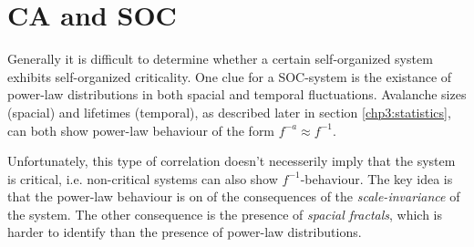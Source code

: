 \section{CA and SOC}
Generally it is difficult to determine whether a certain self-organized system exhibits self-organized criticality. One clue for a SOC-system is the existance of power-law distributions in both spacial and temporal fluctuations. Avalanche sizes (spacial) and lifetimes (temporal), as described later in section \ref{chp3:statistics}, can both show power-law behaviour of the form $f^{-a} \approx f^{-1}$.

Unfortunately, this type of correlation doesn't necesserily imply that the system is critical, i.e. non-critical systems can also show $f^{-1}$-behaviour. The key idea is that the power-law behaviour is on of the consequences of the \emph{scale-invariance} of the system. The other consequence is the presence of \emph{spacial fractals}, which is harder to identify than the presence of power-law distributions.
